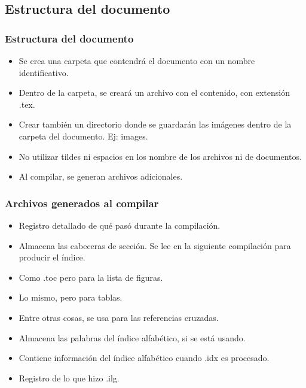 \documentclass[aspectratio=1610]{beamer}%
\begin{document}
\subsection{Estructura del documento}
\begin{frame}[fragile]
\frametitle{\textbf{Estructura del documento}}
\justifying
 \begin{itemize}\justifying
  \item Se crea una carpeta que contendrá el documento con un nombre identificativo.
  \item Dentro de la carpeta, se creará un archivo con el contenido, con extensión .tex.
  \item Crear también un directorio donde se guardarán las imágenes dentro de la carpeta del documento. Ej: images.
  \item No utilizar tildes ni espacios en los nombre de los archivos ni de documentos.
  \item Al compilar, se generan archivos adicionales.
\end{itemize}

\end{frame}

\begin{frame}[fragile]
\frametitle{\textbf{Archivos generados al compilar}}
\justifying
 \begin{itemize}\justifying
  \item [.log] Registro detallado de qué pasó durante la compilación.
  \item [.toc] Almacena las cabeceras de sección. Se lee en la siguiente compilación para producir el índice.
  \item [.lof] Como .toc pero para la lista de figuras.
  \item [.lot] Lo mismo, pero para tablas.
  \item [.aux] Entre otras cosas, se usa para las referencias cruzadas.
  \item [.idx] Almacena las palabras del índice alfabético, si se está usando.
  \item [.ind] Contiene información del índice alfabético cuando .idx es procesado.
  \item [.ilg] Registro de lo que hizo .ilg.
\end{itemize}

\end{frame}
\end{document}
